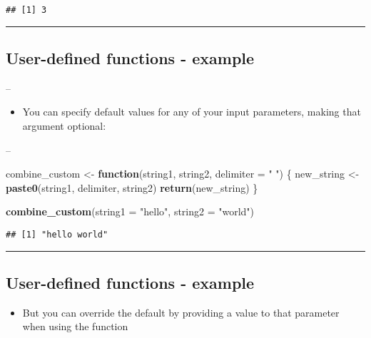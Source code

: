 \documentclass[]{article}
\newenvironment{Shaded}{\begin{snugshade}}{\end{snugshade}}
\newcommand{\ControlFlowTok}[1]{\textcolor[rgb]{0.13,0.29,0.53}{\textbf{#1}}}
\newcommand{\DataTypeTok}[1]{\textcolor[rgb]{0.13,0.29,0.53}{#1}}
\newcommand{\KeywordTok}[1]{\textcolor[rgb]{0.13,0.29,0.53}{\textbf{#1}}}
\newcommand{\NormalTok}[1]{#1}
\newcommand{\StringTok}[1]{\textcolor[rgb]{0.31,0.60,0.02}{#1}}
\providecommand{\tightlist}{%
  \setlength{\itemsep}{0pt}\setlength{\parskip}{0pt}}
\begin{document}
\begin{verbatim}
## [1] 3
\end{verbatim}

\begin{center}\rule{0.5\linewidth}{\linethickness}\end{center}

\hypertarget{user-defined-functions---example-2}{%
\subsection{User-defined functions -
example}\label{user-defined-functions---example-2}}

--

\begin{itemize}
\tightlist
\item
  You can specify default values for any of your input parameters,
  making that argument optional:
\end{itemize}

--

\begin{Shaded}
\begin{Highlighting}[]
\NormalTok{combine_custom <-}\StringTok{ }\ControlFlowTok{function}\NormalTok{(string1, string2, }\DataTypeTok{delimiter =} \StringTok{" "}\NormalTok{) \{}
\NormalTok{  new_string <-}\StringTok{ }\KeywordTok{paste0}\NormalTok{(string1, delimiter, string2)}
  \KeywordTok{return}\NormalTok{(new_string)}
\NormalTok{\}}

\KeywordTok{combine_custom}\NormalTok{(}\DataTypeTok{string1 =} \StringTok{"hello"}\NormalTok{, }\DataTypeTok{string2 =} \StringTok{"world"}\NormalTok{)}
\end{Highlighting}
\end{Shaded}

\begin{verbatim}
## [1] "hello world"
\end{verbatim}

\begin{center}\rule{0.5\linewidth}{\linethickness}\end{center}

\hypertarget{user-defined-functions---example-3}{%
\subsection{User-defined functions -
example}\label{user-defined-functions---example-3}}

\begin{itemize}
\tightlist
\item
  But you can override the default by providing a value to that
  parameter when using the function
\end{itemize}
\end{document}
